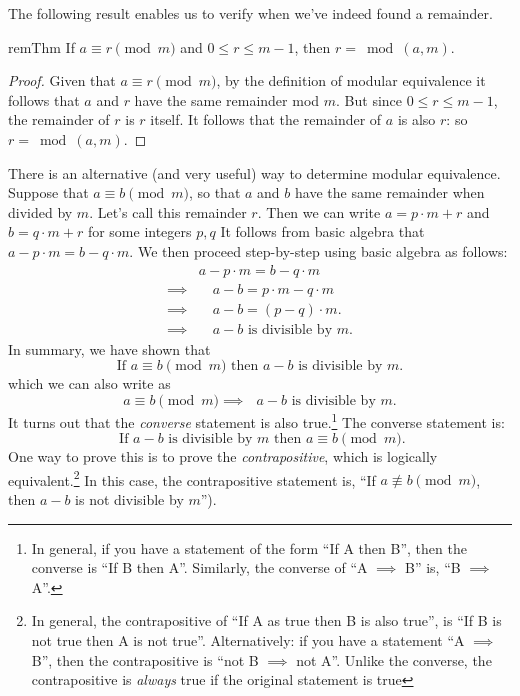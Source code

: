 The following result enables us to verify when we've indeed found a remainder.

\begin{prop}{remThm} If $a \equiv r \pmod{m}$ and $0 \le r \le m-1$, then $r = \bmod(a,m)$.
\end{prop}

\begin{proof}
Given that $a \equiv r \pmod{m}$, by the definition of modular equivalence it follows that $a$ and $r$ have the same remainder mod $m$.  But since $0 \le r \le m-1$, the remainder of $r$ is $r$ itself. It follows that the remainder of $a$ is also $r$: so $r = \bmod(a,m)$.
\end{proof}

There is an alternative (and very useful) way to determine modular equivalence.
Suppose that $a \equiv b \pmod{m}$, so that $a$ and $b$ have the same remainder when divided by $m$. Let's call this remainder $r$. Then we can write  $a = p \cdot m + r$ and $b = q \cdot m + r$ for some integers $p,q$ It follows from basic algebra that $a - p \cdot m =b - q \cdot m$. We then proceed step-by-step using basic algebra as follows:
\begin{align*}
&a - p \cdot m = b - q \cdot m \\
\implies &\quad a - b = p \cdot m - q \cdot m \\
\implies &\quad a - b = (p - q) \cdot m. \\
\implies &\quad a - b  \text{ is divisible by } m.
\end{align*}
In summary, we have shown that
\[\text{If } a \equiv b \pmod{m}  \text{ then } a - b \text{ is divisible by } m.\]
which we can also write as
\[a \equiv b \pmod{m} \implies \mbox{ $a - b$ is divisible by $m$.}\]
It turns out that the \emph{converse} statement is also true.\footnote{In general, if you have a statement of the form ``If A then B'', then the converse  is ``If B then A''.  Similarly, the converse of ``A $\implies$ B'' is, ``B $\implies$ A''.}  The converse statement is: 
\[\mbox{ If  $a - b$ is divisible by $m$  then }a \equiv b \pmod{m}. \]
One way to prove this is to prove the \emph{contrapositive},  which is logically equivalent.\footnote{In general, the contrapositive of ``If A as true then B is also true'',  is ``If B is not true then A is not true''.  Alternatively: if you have a statement ``A $\implies$ B'', then the contrapositive is ``not B $\implies$ not A''. Unlike the converse, the contrapositive is \emph{always} true if the original statement is true} In this case, the contrapositive statement is, ``If $a \not\equiv b \pmod{m}$, then $a-b$ is not divisible by $m$'').

